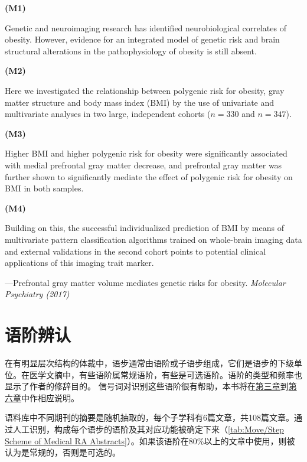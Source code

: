 \documentclass[a4paper]{ctexbook}
\begin{document}
\begin{sample}[label={myautocounter}]{\heiti}
\textbf{(M1)}

Genetic and neuroimaging research has identified neurobiological correlates of obesity. However, evidence for an integrated model of genetic risk and brain structural alterations in the pathophysiology of obesity is still absent.

\textbf{(M2)}

Here we investigated the relationship between polygenic risk for obesity, gray matter structure and body mass index (BMI) by the use of univariate and multivariate analyses in two large, independent cohorts ($n=330$ and $n=347$).

\textbf{(M3)}

Higher BMI and higher polygenic risk for obesity were significantly associated with medial prefrontal gray matter decrease, and prefrontal gray matter was further shown to significantly mediate the effect of polygenic risk for obesity on BMI in both samples.

\textbf{(M4)}

Building on this, the successful individualized prediction of BMI by means of multivariate pattern classification algorithms trained on whole-brain imaging data and external validations in the second cohort points to potential clinical applications of this imaging trait marker.

\begin{flushright}
  ---Prefrontal gray matter volume mediates genetic risks for obesity. \emph{Molecular Psychiatry (2017)}
\end{flushright}

\end{sample}

\section{语阶辨认}

在有明显层次结构的体裁中，语步通常由语阶或子语步组成，它们是语步的下级单位。在医学文摘中，有些语阶属常规语阶，有些是可选语阶。语阶的类型和频率也显示了作者的修辞目的。 信号词对识别这些语阶很有帮助，本书将在\hyperref[chapter3]{第三章}到\hyperref[chapter6]{第六章}中作相应说明。

语料库中不同期刊的摘要是随机抽取的，每个子学科有6篇文章，共108篇文章。通过人工识别，构成每个语步的语阶及其对应功能被确定下来（\autoref{tab:Move/Step Scheme of Medical RA Abstracts}）。如果该语阶在80\%以上的文章中使用，则被认为是常规的，否则是可选的。
\end{document}

